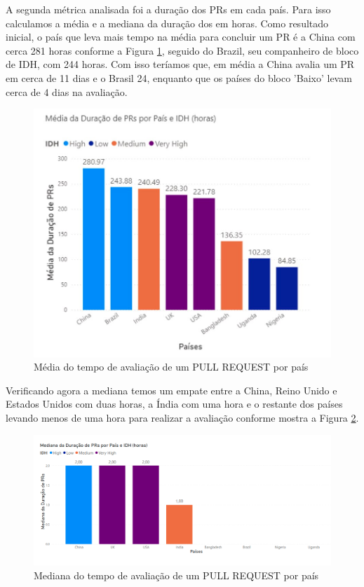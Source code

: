 \documentclass[12pt]{article}
\begin{document}
A segunda métrica analisada foi a duração dos PRs em cada país. Para isso calculamos a média e a mediana da duração dos em horas. Como resultado inicial, o país que leva mais tempo na média para concluir um PR é a China com cerca 281 horas conforme a Figura \ref{fig:media_prs}, seguido do Brazil, seu companheiro de bloco de IDH, com 244 horas. Com isso teríamos que, em média a China avalia um PR em cerca de 11 dias e o Brasil 24, enquanto que os países do bloco 'Baixo' levam cerca de 4 dias na avaliação. 

\begin{figure}[H]
\centering
\includegraphics[width=1\textwidth]{img/rq3/media pr.png}
\caption{Média do tempo de avaliação de um PULL REQUEST por país}
\label{fig:media_prs}
\end{figure}

Verificando agora a mediana temos um empate entre a China, Reino Unido e Estados Unidos com duas horas, a Índia com uma hora e o restante dos países levando menos de uma hora para realizar a avaliação conforme mostra a Figura \ref{fig:mediana_prs}.

\begin{figure}[H]
\centering
\includegraphics[width=1\textwidth]{img/rq3/mediana prs.png}
\caption{Mediana do tempo de avaliação de um PULL REQUEST por país}
\label{fig:mediana_prs}
\end{figure}
\end{document}
